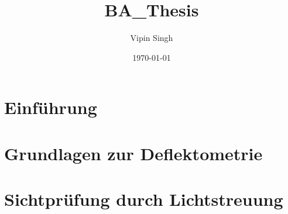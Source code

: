 \documentclass[ngerman,11pt,a4paper]{report}
\author{Vipin Singh}
\title{BA_Thesis}
\date{\today}
\begin{document}
	
	  
	\begin{abstract}
		\FloatBarrier %
		\setcounter{page}{2}
		
	\end{abstract}
	    
	{
		\FloatBarrier %
		\setcounter{page}{3}
		\tableofcontents
	}
	    
	{
		\FloatBarrier %
		\newpage
		\listoffigures
	}
	
	{
		\FloatBarrier %
		\newpage
		\printglossary[title=Abkürzungsverzeichnis, type=\acronymtype]
		
	}
	
	{
		\FloatBarrier %
		\chapter{Einführung}
		\label{chp:einfuehrung}
		
	}
	
	{
		\FloatBarrier %
		\chapter{Grundlagen zur Deflektometrie}
		\label{chp:grundlagenDeflektometrie}
		
	}
	
	{
		\FloatBarrier %
		\chapter{Sichtprüfung durch Lichtstreuung}
		\label{chp:sichtpruefungDurchLichtstreuung}
		
	}
	
\end{document}
